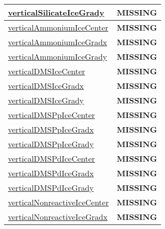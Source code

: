 {\begin{center}
\begin{longtable}{| p{2.0in} | p{4.0in} |}
    \hline
    \hyperref[subsec:var_sec_tracer_reconstruction_verticalSilicateIceGrady]{verticalSilicateIceGrady} & {\bf \color{red} MISSING} \\
    \hline
    \hyperref[subsec:var_sec_tracer_reconstruction_verticalAmmoniumIceCenter]{verticalAmmoniumIceCenter} & {\bf \color{red} MISSING} \\
    \hline
    \hyperref[subsec:var_sec_tracer_reconstruction_verticalAmmoniumIceGradx]{verticalAmmoniumIceGradx} & {\bf \color{red} MISSING} \\
    \hline
    \hyperref[subsec:var_sec_tracer_reconstruction_verticalAmmoniumIceGrady]{verticalAmmoniumIceGrady} & {\bf \color{red} MISSING} \\
    \hline
    \hyperref[subsec:var_sec_tracer_reconstruction_verticalDMSIceCenter]{verticalDMSIceCenter} & {\bf \color{red} MISSING} \\
    \hline
    \hyperref[subsec:var_sec_tracer_reconstruction_verticalDMSIceGradx]{verticalDMSIceGradx} & {\bf \color{red} MISSING} \\
    \hline
    \hyperref[subsec:var_sec_tracer_reconstruction_verticalDMSIceGrady]{verticalDMSIceGrady} & {\bf \color{red} MISSING} \\
    \hline
    \hyperref[subsec:var_sec_tracer_reconstruction_verticalDMSPpIceCenter]{verticalDMSPpIceCenter} & {\bf \color{red} MISSING} \\
    \hline
    \hyperref[subsec:var_sec_tracer_reconstruction_verticalDMSPpIceGradx]{verticalDMSPpIceGradx} & {\bf \color{red} MISSING} \\
    \hline
    \hyperref[subsec:var_sec_tracer_reconstruction_verticalDMSPpIceGrady]{verticalDMSPpIceGrady} & {\bf \color{red} MISSING} \\
    \hline
    \hyperref[subsec:var_sec_tracer_reconstruction_verticalDMSPdIceCenter]{verticalDMSPdIceCenter} & {\bf \color{red} MISSING} \\
    \hline
    \hyperref[subsec:var_sec_tracer_reconstruction_verticalDMSPdIceGradx]{verticalDMSPdIceGradx} & {\bf \color{red} MISSING} \\
    \hline
    \hyperref[subsec:var_sec_tracer_reconstruction_verticalDMSPdIceGrady]{verticalDMSPdIceGrady} & {\bf \color{red} MISSING} \\
    \hline
    \hyperref[subsec:var_sec_tracer_reconstruction_verticalNonreactiveIceCenter]{verticalNonreactiveIceCenter} & {\bf \color{red} MISSING} \\
    \hline
    \hyperref[subsec:var_sec_tracer_reconstruction_verticalNonreactiveIceGradx]{verticalNonreactiveIceGradx} & {\bf \color{red} MISSING} \\

\end{longtable}
\end{center}}
